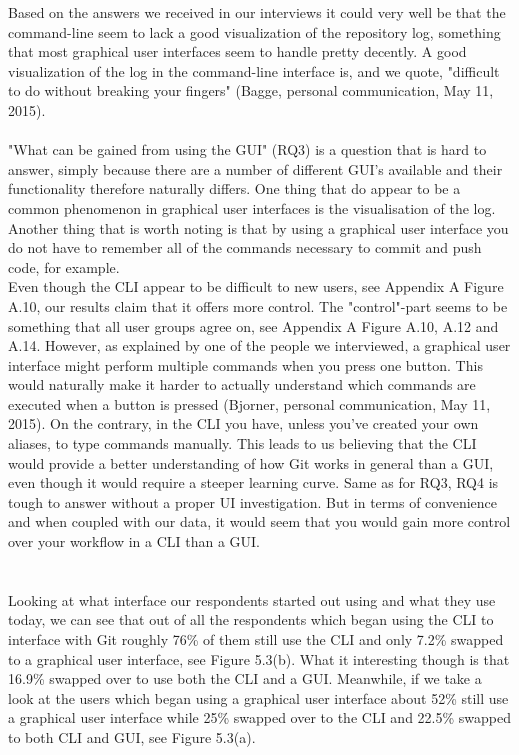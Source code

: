\documentclass[a4paper,oneside]{bth} %
\begin{document}
				Based on the answers we received in our interviews it could very well be that the command-line seem to lack a good visualization of the repository log, something that most graphical user interfaces seem to handle pretty decently.
				A good visualization of the log in the command-line interface is, and we quote, "difficult to do without breaking your fingers" (Bagge, personal communication, May 11, 2015). %
				\\\\
				"What can be gained from using the GUI" (RQ3) is a question that is hard to answer, simply because there are a number of different GUI's available and their functionality therefore naturally differs.
				One thing that do appear to be a common phenomenon in graphical user interfaces is the visualisation of the log.
				Another thing that is worth noting is that by using a graphical user interface you do not have to remember all of the commands necessary to commit and push code, for example.\\
				
				Even though the CLI appear to be difficult to new users, see Appendix A Figure A.10, our results claim that it offers more control. The "control"-part seems to be something that all user groups agree on, see Appendix A Figure A.10, A.12 and A.14.
				However, as explained by one of the people we interviewed, a graphical user interface might perform multiple commands when you press one button. This would naturally make it harder to actually understand which commands are executed when a button is pressed (Bjorner, personal communication, May 11, 2015). %
				On the contrary, in the CLI you have, unless you've created your own aliases, to type commands manually.
				This leads to us believing that the CLI would provide a better understanding of how Git works in general than a GUI, even though it would require a steeper learning curve.
				Same as for RQ3, RQ4 is tough to answer without a proper UI investigation. But in terms of convenience and when coupled with our data, it would seem that you would gain more control over your workflow in a CLI than a GUI.\\
				\\\\
				Looking at what interface our respondents started out using and what they use today, we can see that out of all the respondents which began using the CLI to interface with Git roughly 76\% of them still use the CLI and only 7.2\% swapped to a graphical user interface, see Figure 5.3(b).
				What it interesting though is that 16.9\% swapped over to use both the CLI and a GUI.
				Meanwhile, if we take a look at the users which began using a graphical user interface about 52\% still use a graphical user interface while 25\% swapped over to the CLI and 22.5\% swapped to both CLI and GUI, see Figure 5.3(a).
				
\end{document}
